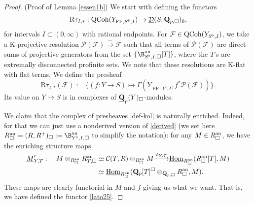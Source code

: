 \documentclass[10pt]{amsart}
\theoremstyle{definition}
\theoremstyle{remark}
\def\lomapr#1{\smash{\mathop{\relbar\joinrel\longrightarrow}\limits^{#1}}}
\newcommand{\uHom}{\underline{{\rm{Hom}} }}
\newcommand{\FF}{\operatorname{FF} }
\newcommand{\sff}{{\mathcal{F}}}
\newcommand{\scc}{{\mathcal{C}}}
\newcommand{\sd}{{\mathcal{D}}}
\newcommand{\spp}{{\mathcal{P}}}
\numberwithin{equation}{section}
\def\R{{\mathrm R}}
\def\Q{{\bf Q}} \def\Z{{\bf Z}}
\numberwithin{equation}{section}
\begin{document}
 \begin{proof}{\rm(Proof of Lemma \ref{essen1b})}  We start with defining the functors
 \begin{equation}\label{lato25}
 \R\tau_{I,*}: {\rm QCoh}(Y_{\FF,S^{\flat},I})\to \underline{\sd}(S,\Q_{p,\Box})_0, 
 \end{equation}
 for  intervals $I\subset (0,\infty)$ with rational endpoints. 
 For $\sff\in {\rm QCoh}(Y_{S^{\flat},I})$, we take a K-projective resolution $\spp(\sff)\stackrel{\sim}{\to}\sff$ such that all terms of $\spp(\sff)$ are direct sums of  projective generators from the set
 $\{\B^{\rm an}_{S^{\flat},I,\Box}[T]\}$, where the $T$'s are extremally disconnected profinite sets.
   We note that these resolutions are K-flat with flat terms. We define the presheaf
 \begin{equation}\label{def-kol}
  \R\tau_{I,*}(\sff):= \{(f:Y\to S) \mapsto \Gamma(Y_{\FF, Y^{\flat},I}, f^*\spp(\sff))\}.
 \end{equation}
 Its value on $Y\to S$ is in complexes of $\underline{\Q}_{p}(Y)_{\Box}$-modules.
 
    
   We claim that the complex of presheaves \eqref{def-kol} is naturally enriched. Indeed, for that we can just use a nonderived version of \eqref{derived} (we set  
 here $R^{\rm an}_{\Box}=(R,R^+)_{\Box}:=\B^{\rm an}_{Y^{\flat},I,\Box}$ to simplify the notation):
 for   any $M\in R^{\rm an}_{\Box}$, we have the enriching structure maps
\begin{align}\label{kol-def11}
\underline{M}^{\prime}_{Y,T}:\quad   M\otimes_{R^{\rm an}_{\Box}}R^{\rm an}_{T,\Box}  & \simeq \scc(T,R)\otimes_{R^{\rm an}_{\Box}} M
  \lomapr{\delta_{Y,T}} \uHom_{R^{\rm an}_{\Box}}(R^{\rm an}_{\Box}[T],M)\\
 & \simeq \uHom_{R^{\rm an}_{\Box}}(\Q_p[ T]^{\Box}\otimes_{\Q_{p,\Box}}R^{\rm an}_{\Box}, M).\notag
\end{align}
 These maps are clearly functorial in $M$ and $f$ giving us what we want. That is, we have defined  
the functor \eqref{lato25}.
 

\end{proof}
\end{document}
